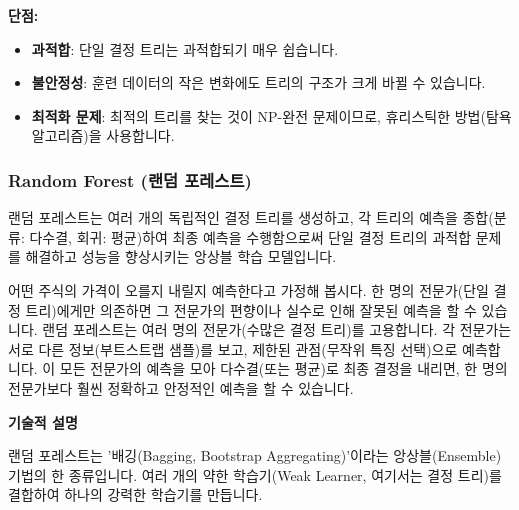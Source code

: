 \documentclass[11pt,a4paper]{article}
\theoremstyle{definition}
\begin{document}
\textbf{단점:}
\begin{itemize}
    \item \textbf{과적합}: 단일 결정 트리는 과적합되기 매우 쉽습니다.
    \item \textbf{불안정성}: 훈련 데이터의 작은 변화에도 트리의 구조가 크게 바뀔 수 있습니다.
    \item \textbf{최적화 문제}: 최적의 트리를 찾는 것이 NP-완전 문제이므로, 휴리스틱한 방법(탐욕 알고리즘)을 사용합니다.
\end{itemize}

\subsubsection{Random Forest (랜덤 포레스트)}

\begin{summarybox}[title={한 줄 핵심 요약}]
랜덤 포레스트는 여러 개의 독립적인 결정 트리를 생성하고, 각 트리의 예측을 종합(분류: 다수결, 회귀: 평균)하여 최종 예측을 수행함으로써 단일 결정 트리의 과적합 문제를 해결하고 성능을 향상시키는 앙상블 학습 모델입니다.
\end{summarybox}

\begin{examplebox}[title={직관적 예시/비유}]
어떤 주식의 가격이 오를지 내릴지 예측한다고 가정해 봅시다. 한 명의 전문가(단일 결정 트리)에게만 의존하면 그 전문가의 편향이나 실수로 인해 잘못된 예측을 할 수 있습니다. 랜덤 포레스트는 여러 명의 전문가(수많은 결정 트리)를 고용합니다. 각 전문가는 서로 다른 정보(부트스트랩 샘플)를 보고, 제한된 관점(무작위 특징 선택)으로 예측합니다. 이 모든 전문가의 예측을 모아 다수결(또는 평균)로 최종 결정을 내리면, 한 명의 전문가보다 훨씬 정확하고 안정적인 예측을 할 수 있습니다.
\end{examplebox}

\textbf{기술적 설명}

랜덤 포레스트는 '배깅(Bagging, Bootstrap Aggregating)'이라는 앙상블(Ensemble) 기법의 한 종류입니다. 여러 개의 약한 학습기(Weak Learner, 여기서는 결정 트리)를 결합하여 하나의 강력한 학습기를 만듭니다.
\end{document}

